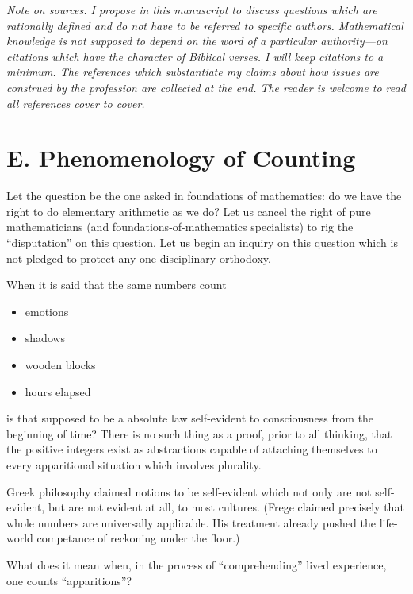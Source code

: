 { \itshape Note on sources. I propose in this manuscript to discuss questions which are rationally defined and do not have to be referred to specific authors. Mathematical knowledge is not supposed to depend on the word of a particular authority---on citations which have the character of Biblical verses. I will keep citations to a minimum. The references which substantiate my claims about how issues are construed by the profession are collected at the end. The reader is welcome to read all references cover to cover.}

\jarule

\section*{E. Phenomenology of Counting}

Let the question be the one asked in foundations of mathematics: do we have the right to do elementary arithmetic as we do? Let us cancel the right of pure mathematicians (and foundations-of-mathematics specialists) to rig the \enquote{disputation} on this question. Let us begin an inquiry on this question which is not pledged to protect any one disciplinary orthodoxy.

When it is said that the same numbers count
\begin{itemize}
\item emotions
\item shadows
\item wooden blocks
\item hours elapsed
\end{itemize}
is that supposed to be a absolute law self-evident to consciousness from the beginning of time? There is no such thing as a proof, prior to all thinking, that the positive integers exist as abstractions capable of attaching themselves to every apparitional situation which involves plurality.

Greek philosophy claimed notions to be self-evident which not only are not self-evident, but are not evident at all, to most cultures. (Frege claimed precisely that whole numbers are universally applicable. His treatment already pushed the life-world competance of reckoning under the floor.)

\jarule

What does it mean when, in the process of \enquote{comprehending} lived experience, one counts \enquote{apparitions}?

